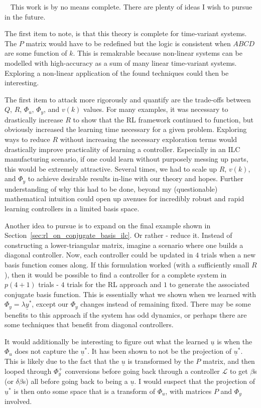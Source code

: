 ~\label{sec:future_work}
This work is by no means complete. There are plenty of ideas I wish to pursue in the future.

The first item to note, is that this theory is complete for time-variant systems. The $P$ matrix would have to be redefined but the logic is consistent when $ABCD$ are some function of $k$. This is remakrable because non-linear systems can be modelled with high-accuracy as a sum of many linear time-variant systems. Exploring a non-linear application of the found techniques could then be interesting.

The first item to attack more rigorously and quantify are the trade-offs between $Q$, $R$, $\Phi_u$, $\Phi_y$, and $v(k)$ values. For many examples, it was necessary to drastically increase $R$ to show that the RL framework continued to function, but obviously increased the learning time necessary for a given problem. Exploring ways to reduce $R$ without increasing the necessary exploration terms would drastically improve practicality of learning a controller. Especially in an ILC manufacturing scenario, if one could learn without purposely messing up parts, this would be extremely attractive. Several times, we had to scale up $R$, $v(k)$, and $\Phi_y$ to achieve desirable results in-line with our theory and hopes. Further understanding of why this had to be done, beyond my (questionable) mathematical intuition could open up avenues for incredibly robust and rapid learning controllers in a limited basis space.

Another idea to pursue is to expand on the final example shown in Section~\ref{sec:rl_on_conjugate_basis_ilc}. 
Or rather - reduce it. Instead of constructing a lower-triangular matrix, imagine a scenario where one builds a diagonal controller. Now, each controller could be updated in $4$ trials when a new basis function comes along. If this formulation worked (with a sufficiently small $R$), then it would be possible to find a controller for a complete system in $p(4 + 1)$ trials - $4$ trials for the RL approach and $1$ to generate the associated conjugate basis function. This is essentially what we shown when we learned with $\Phi_y = \lambda \underline{y}^\ast$, except our $\Phi_y$ changes instead of remaining fixed. There may be some benefits to this approach if the system has odd dynamics, or perhaps there are some techniques that benefit from diagonal controllers.

It would additionally be interesting to figure out what the learned $\underline{u}$ is when the $\Phi_u$ does not capture the $\underline{u}^\ast$. It has been shown to not be the projection of $\underline{u}^\ast$. This is likely due to the fact that the $\underline{u}$ is transformed by the $P$ matrix, and then looped through $\Phi_y^+$ conversions before going back through a controller $\mathcal{L}$ to get $\beta$s (or $\delta \beta$s) all before going back to being a $\underline{u}$. I would suspect that the projection of $\underline{u}^\ast$ is then onto some space that is a transform of $\Phi_u$, with matrices $P$ and $\Phi_y$ involved.

